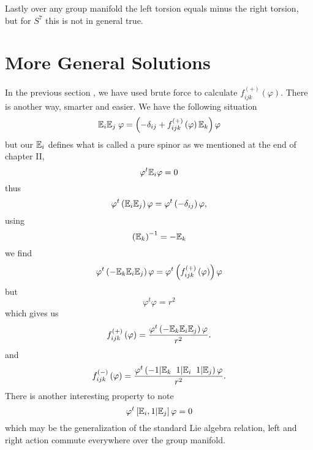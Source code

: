 \documentclass[a4paper,12pt]{book}
\begin{document}
Lastly over any group manifold the left torsion equals minus the right
torsion, but for $S^{7}$ this is not in general true.

\section{More General Solutions}

In the previous section , we have used brute force to calculate $%
f_{ijk}^{\left( +\right) }\left( \varphi \right) $. There is another way,
smarter and easier. We have the following situation 
\begin{equation}
\Bbb{E}_{i}\Bbb{E}_{j}\;\varphi =\left( -\delta _{ij}+f_{ijk}^{\left(
+\right) }\left( \varphi \right) \Bbb{E}_{k}\right) \varphi
\end{equation}
but our $\Bbb{E}_{i}$ defines what is called a pure spinor as we mentioned
at the end of chapter II, 
\begin{equation}
\varphi ^{t}\Bbb{E}_{i}\varphi =0
\end{equation}
thus 
\begin{equation}
\varphi ^{t}\left( \Bbb{E}_{i}\Bbb{E}_{j}\right) \varphi =\varphi ^{t}\left(
-\delta _{ij}\right) \varphi ,
\end{equation}
using 
\begin{equation}
\left( \Bbb{E}_{k}\right) ^{-1}=-\Bbb{E}_{k}
\end{equation}
we find 
\begin{equation}
\varphi ^{t}\left( -\Bbb{E}_{k}\Bbb{E}_{i}\Bbb{E}_{j}\right) \varphi
=\varphi ^{t}\left( f_{ijk}^{\left( +\right) }\left( \varphi \right) \right)
\varphi
\end{equation}
but 
\begin{equation}
\varphi ^{t}\varphi =r^{2}
\end{equation}
which gives us 
\begin{equation}
f_{ijk}^{\left( +\right) }\left( \varphi \right) =\frac{\varphi ^{t}\left( -%
\Bbb{E}_{k}\Bbb{E}_{i}\Bbb{E}_{j}\right) \varphi }{r^{2}}.
\end{equation}
and 
\begin{equation}
f_{ijk}^{\left( -\right) }\left( \varphi \right) =\frac{\varphi ^{t}\left(
-1|\Bbb{E}_{k}\;\;1|\Bbb{E}_{i}\;\;1|\Bbb{E}_{j}\right) \varphi }{r^{2}}.
\end{equation}
There is another interesting property to note 
\begin{equation}
\varphi ^{t}\left[ \Bbb{E}_{i},1|\Bbb{E}_{j}\right] \varphi =0
\end{equation}
which may be the generalization of the standard Lie algebra relation, left
and right action commute everywhere over the group manifold.
\end{document}
